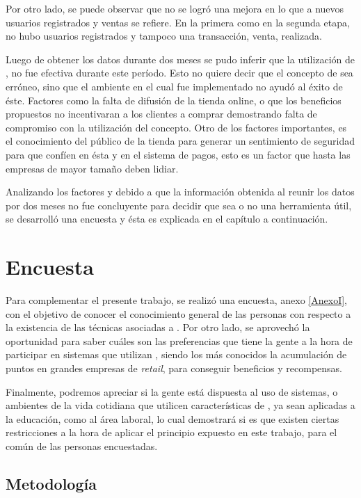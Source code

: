 Por otro lado, se puede observar que no se logró una mejora en lo que a nuevos
usuarios registrados y ventas se refiere.
En la primera como en la segunda etapa, no hubo usuarios registrados y tampoco
una transacción, venta, realizada.

Luego de obtener los datos durante dos meses se pudo inferir que la utilización
de {\gam}, no fue efectiva durante este período. Esto no quiere decir que el concepto
de {\gam} sea erróneo, sino que el ambiente en el cual fue implementado no ayudó
al éxito de éste. Factores como la falta de difusión de la tienda online,
 o que los beneficios propuestos no incentivaran a
 los clientes a comprar demostrando falta de compromiso con la utilización del
concepto. Otro de los factores importantes, es el conocimiento del público de la tienda 
para generar un sentimiento de seguridad para que confíen en ésta y en el sistema de pagos, 
esto es un factor que hasta las empresas de mayor tamaño deben lidiar.

Analizando los factores y debido a que la información obtenida al reunir los datos por dos
 meses no fue concluyente para decidir que {\gam} sea o no una herramienta útil, se
desarrolló una encuesta y ésta es explicada en el capítulo a continuación.

\section{Encuesta}

Para complementar el presente trabajo, se realizó una encuesta, anexo \ref{AnexoI}, con el objetivo de
conocer el conocimiento general de las personas con respecto a la existencia
de las técnicas asociadas a {\gam}.
Por otro lado, se aprovechó la oportunidad para saber cuáles son las preferencias
que tiene la gente a la hora de participar en sistemas que utilizan {\gam},
siendo los más conocidos la acumulación de puntos en grandes empresas de \emph{retail},
para conseguir beneficios y recompensas.

Finalmente, podremos apreciar si la gente está dispuesta al uso de sistemas,
o ambientes de la vida cotidiana que utilicen características de {\gam},
ya sean aplicadas a la educación, como al área laboral, lo cual demostrará
 si es que existen ciertas restricciones a la hora de aplicar
el principio expuesto en este trabajo, para el común de las personas
encuestadas.

\subsection{Metodología}

